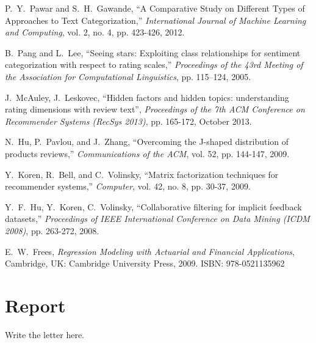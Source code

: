 \documentclass[11pt,a4]{article}
\begin{document}
\begin{thebibliography}{00}


P.~Y.~Pawar and S.~H.~Gawande, ``A Comparative Study on Different Types of Approaches to Text Categorization,'' \textit{International Journal of Machine Learning and Computing}, vol. 2, no. 4, pp. 423-426, 2012.

B.~Pang and L.~Lee, ``Seeing stars: Exploiting class relationships for sentiment categorization with respect to rating scales,'' \textit{Proceedings of the 43rd Meeting of the Association for Computational Linguistics}, pp. 115–124, 2005.

J.~McAuley, J.~Leskovec, ``Hidden factors and hidden topics: understanding rating dimensions with review text'', \textit{Proceedings of the 7th ACM Conference on Recommender Systems (RecSys 2013)}, pp. 165-172, October 2013.

N.~Hu, P.~Pavlou, and J.~Zhang, ``Overcoming the J-shaped distribution of products reviews,'' \textit{Communications of the ACM}, vol. 52, pp. 144-147, 2009. 

Y.~Koren, R.~Bell, and C.~Volinsky, ``Matrix factorization techniques for recommender systems,'' \textit{Computer}, vol. 42, no. 8, pp. 30-37, 2009.

Y.~F.~Hu, Y.~Koren, C.~Volinsky, ``Collaborative filtering for implicit feedback datasets,'' \textit{Proceedings of IEEE International Conference on Data Mining (ICDM 2008)}, pp. 263-272, 2008.

E.~W.~Frees, \textit{Regression Modeling with Actuarial and Financial Applications}, Cambridge, UK: Cambridge University Press, 2009. ISBN: 978-0521135962

\end{thebibliography}




\newpage
\thispagestyle{empty}

{\centering\section*{Report}}

Write the letter here.



\end{document}
